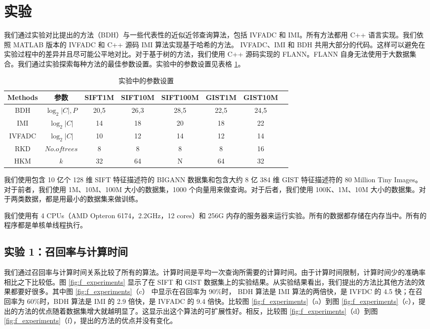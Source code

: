 \section{实验}
我们通过实验对比提出的方法（BDH）与一些代表性的近似近邻查询算法，包括 IVFADC 和 IMI。所有方法都用 C++ 语言实现。我们依照 MATLAB 版本的 IVFADC 和 C++ 源码 IMI 算法实现基于哈希的方法。 IVFADC、IMI 和 BDH 共用大部分的代码。这样可以避免在实验过程中的差异并且尽可能公平地对比。对于基于树的方法，我们使用 C++ 源码实现的 FLANN。FLANN 自身无法使用于大数据集合。我们通过实验探索每种方法的最佳参数设置。实验中的参数设置见表格 \ref{tab:f_parameters}。
\begin{table}[htbp]
  \centering
  \caption{实验中的参数设置}
  \label{tab:f_parameters}
  \begin{minipage}[t]{\linewidth}
    \begin{tabular}{|c|c|c|c|c|c|c|c|}
      \hline
        Methods  & 参数 & SIFT1M& SIFT10M& SIFT100M& GIST1M&GIST10M\\
      \hline
      BDH  &  $\log_2|C|,P$& 20,5 & 26,3 & 28,5 & 22,5 & 24,5\\
      \hline
      IMI  &  $\log_2|C|$  & 14 & 18 & 20 & 18 & 22\\
      \hline
   IVFADC  &  $\log_2|C|$  & 10 & 12 & 14 & 12 & 14\\
    \hline
      RKD  &  $No.of trees$& 8  &  8 &  8 &  8 & 16\\
      \hline
      HKM  &  $k$          & 32 & 64 &  N & 64 & 32\\
      \hline
    \end{tabular}
  \end{minipage}
\end{table}
我们使用包含 10 亿个 128 维 SIFT 特征描述符的 BIGANN 数据集和包含大约 8 亿 384 维 GIST 特征描述符的 80 Million Tiny Images。对于前者，我们使用 1M、10M、100M 大小的数据集，1000 个向量用来做查询。对于后者，我们使用 100K、1M、10M 大小的数据集。对于两类数据，都是用最小的数据集来做训练。

我们使用有 4 CPUs（AMD Opteron 6174，2.2GHz，12 cores）和 256G 内存的服务器来运行实验。所有的数据都存储在内存当中。所有的程序都是单核单线程执行。
\subsection{实验 1：召回率与计算时间}
我们通过召回率与计算时间关系比较了所有的算法。计算时间是平均一次查询所需要的计算时间。由于计算时间限制，计算时间少的准确率相比之下比较低。图 \ref{fig:f_experiments} 显示了在 SIFT 和 GIST 数据集上的实验结果。从实验结果看出，我们提出的方法比其他方法的效果都要好很多。其中图 \ref{fig:f_experiments}（c） 中显示在召回率为 90\%时， BDH 算法是 IMI 算法的两倍快，是 IVFDC 的 4.5 快；在召回率为 60\%时，BDH 算法是 IMI 的 2.9 倍快，是 IVFADC 的 9.4 倍快。比较图 \ref{fig:f_experiments}（a）到图 \ref{fig:f_experiments}（c），提出的方法的优点随着数据集增大就越明显了。这显示出这个算法的可扩展性好。相反，比较图 \ref{fig:f_experiments}（d）到图 \ref{fig:f_experiments}（f），提出的方法的优点并没有变化。

